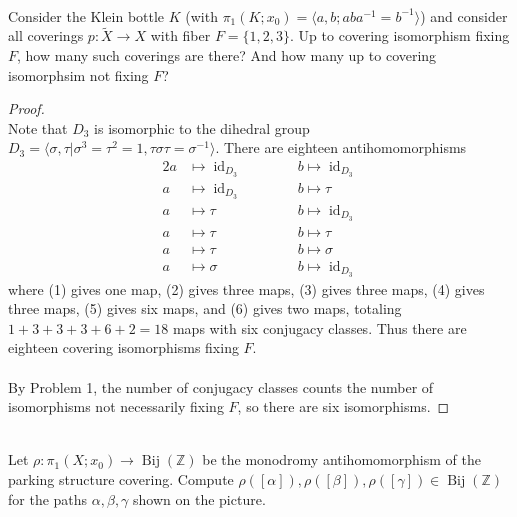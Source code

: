 \documentclass{article}
\newenvironment{problem}[2][Problem]{\begin{trivlist}
\item[\hskip \labelsep {\bfseries #1}\hskip \labelsep {\bfseries #2.}]}{\end{trivlist}}
\newcommand{\fn}[3]{#1 \colon #2 \rightarrow #3}
\newcommand{\inv}[1]{#1^{-1}}
\newcommand{\set}[1]{\{ #1 \}}
\begin{document}
\pagebreak
\begin{problem}{3} \text{} \\
  Consider the Klein bottle $K$
  (with $\pi_1(K; x_0) = \langle a, b; ab\inv{a} = \inv{b}\rangle$)
  and consider all coverings
  $\fn{p}{\widetilde X}{X}$ with fiber $F = \set{1, 2, 3}$. Up to covering
  isomorphism fixing $F$, how many such coverings are there? And how many up to
  covering isomorphsim not fixing $F$?
\end{problem}

\begin{proof} \text{} \\
  Note that $D_3$ is isomorphic to the dihedral group
  $D_3 = \langle \sigma, \tau | \sigma^3 = \tau^2 = 1, \tau\sigma\tau = \inv\sigma \rangle$.
  \setcounter{equation}{0}
  There are eighteen antihomomorphisms \begin{alignat}{2}
    a &\mapsto \operatorname{id}_{D_3} &&\hspace{1cm} b \mapsto \operatorname{id}_{D_3} \\
    a &\mapsto \operatorname{id}_{D_3} &&\hspace{1cm} b \mapsto \tau \\
    a &\mapsto \tau &&\hspace{1cm} b \mapsto \operatorname{id}_{D_3} \\
    a &\mapsto \tau &&\hspace{1cm} b \mapsto \tau \\
    a &\mapsto \tau &&\hspace{1cm} b \mapsto \sigma \\
    a &\mapsto \sigma &&\hspace{1cm} b \mapsto \operatorname{id}_{D_3}
  \end{alignat} where
  (1) gives one map,
  (2) gives three maps,
  (3) gives three maps,
  (4) gives three maps,
  (5) gives six maps, and
  (6) gives two maps,
  totaling $1 + 3 + 3 + 3 + 6 + 2 = 18$ maps with six conjugacy classes.
  Thus there are eighteen covering isomorphisms fixing $F$.
  \\~\\
  By Problem 1, the number of conjugacy classes counts the number of
  isomorphisms not necessarily fixing $F$, so there are six isomorphisms.
\end{proof}
\pagebreak
\begin{problem}{4} \text{} \\
  Let $\fn{\rho}{\pi_1(X; x_0)}{\operatorname{Bij}(\mathbb Z)}$ be the monodromy
  antihomomorphism of the parking structure covering. Compute
  $\rho([\alpha]), \rho([\beta]), \rho([\gamma]) \in \operatorname{Bij}(\mathbb Z)$
  for the paths $\alpha, \beta, \gamma$ shown on the picture.
\end{problem}
\end{document}
